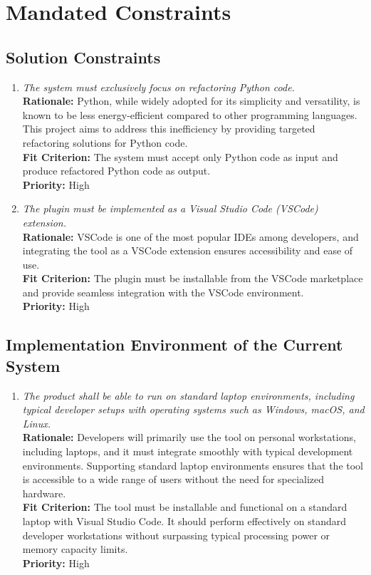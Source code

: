 \documentclass[12pt]{article}
\begin{document}
\section{Mandated Constraints}
\subsection{Solution Constraints}
\begin{enumerate}[label=MD-SL \arabic*., wide=0pt, leftmargin=*]
  \item \emph{The system must exclusively focus on refactoring Python code.}\\[2mm]
    {\bf Rationale:} Python, while widely adopted for its simplicity and versatility, is known to be less energy-efficient compared to other programming languages. This project aims to address this inefficiency by providing targeted refactoring solutions for Python code.\\
    {\bf Fit Criterion:} The system must accept only Python code as input and produce refactored Python code as output.\\
    {\bf Priority:} High

  \item \emph{The plugin must be implemented as a Visual Studio Code (VSCode) extension.}\\[2mm]
    {\bf Rationale:} VSCode is one of the most popular IDEs among developers, and integrating the tool as a VSCode extension ensures accessibility and ease of use.\\
    {\bf Fit Criterion:} The plugin must be installable from the VSCode marketplace and provide seamless integration with the VSCode environment.\\
    {\bf Priority:} High
\end{enumerate}

\subsection{Implementation Environment of the Current System}
\begin{enumerate}[label=MD-EC \arabic*., wide=0pt, leftmargin=*]
  \item \emph{The product shall be able to run on standard laptop
      environments, including typical developer setups with operating
    systems such as Windows, macOS, and Linux.}\\[2mm]
    {\bf Rationale:} Developers will primarily use the tool on
    personal workstations, including laptops, and it must integrate
    smoothly with typical development environments. Supporting
    standard laptop environments ensures that the tool is accessible
    to a wide range of users without the need for specialized hardware.\\
    {\bf Fit Criterion:} The tool must be installable and functional
    on a standard laptop with Visual Studio Code. It should perform
    effectively on standard developer workstations without surpassing typical processing power or memory capacity limits.\\
    {\bf Priority:} High
\end{enumerate}
\end{document}
